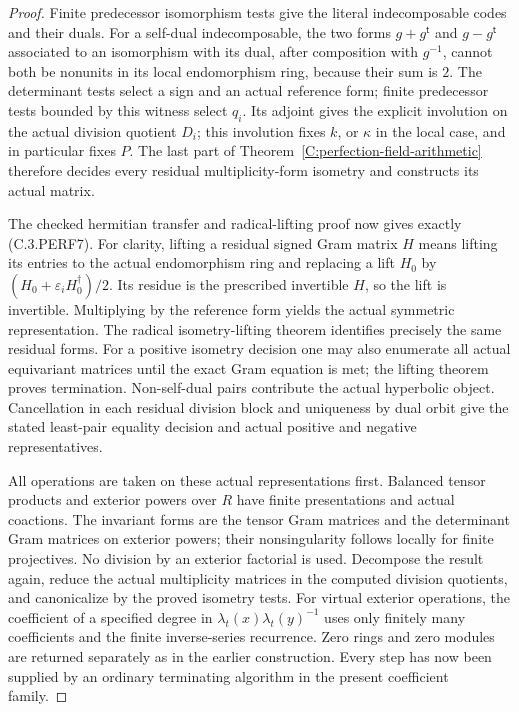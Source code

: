 \begin{proof}
Finite predecessor isomorphism tests give the literal indecomposable
codes and their duals.  For a self-dual indecomposable, the two
forms $g+g^{\mathsf t}$ and $g-g^{\mathsf t}$ associated to an
isomorphism with its dual, after composition with $g^{-1}$, cannot
both be nonunits in its local endomorphism ring, because their sum
is $2$.  The determinant tests select a sign and an actual reference
form; finite predecessor tests bounded by this witness select $q_i$.
Its adjoint gives the explicit involution on the actual division
quotient $D_i$; this involution fixes $k$, or $\kappa$ in the local
case, and in particular fixes $P$.
The last part of Theorem~\ref{C:perfection-field-arithmetic}
therefore decides every residual multiplicity-form isometry and
constructs its actual matrix.

The checked hermitian transfer and radical-lifting proof now gives
exactly (C.3.PERF7).  For clarity, lifting a residual signed Gram
matrix $H$ means lifting its entries to the actual endomorphism
ring and replacing a lift $H_0$ by
$(H_0+\varepsilon_i H_0^\dagger)/2$.  Its residue is the prescribed
invertible $H$, so the lift is invertible.  Multiplying by the
reference form yields the actual symmetric representation.
The radical isometry-lifting theorem identifies precisely the
same residual forms.  For a positive isometry decision one may
also enumerate all actual equivariant matrices until the exact
Gram equation is met; the lifting theorem proves termination.
Non-self-dual pairs contribute the actual hyperbolic object.
Cancellation in each residual division block and uniqueness by
dual orbit give the stated least-pair equality decision and actual
positive and negative representatives.

All operations are taken on these actual representations first.
Balanced tensor products and exterior powers over $R$ have finite
presentations and actual coactions.  The invariant forms are the
tensor Gram matrices and the determinant Gram matrices on exterior
powers; their nonsingularity follows locally for finite projectives.
No division by an exterior factorial is used.  Decompose the result
again, reduce the actual multiplicity matrices in the computed
division quotients, and canonicalize by the proved isometry tests.
For virtual exterior operations, the coefficient of a specified
degree in $\lambda_t(x)\lambda_t(y)^{-1}$ uses only finitely many
coefficients and the finite inverse-series recurrence.
Zero rings and zero modules are returned separately as in the
earlier construction.  Every step has now been supplied by an
ordinary terminating algorithm in the present coefficient family.
\end{proof}

